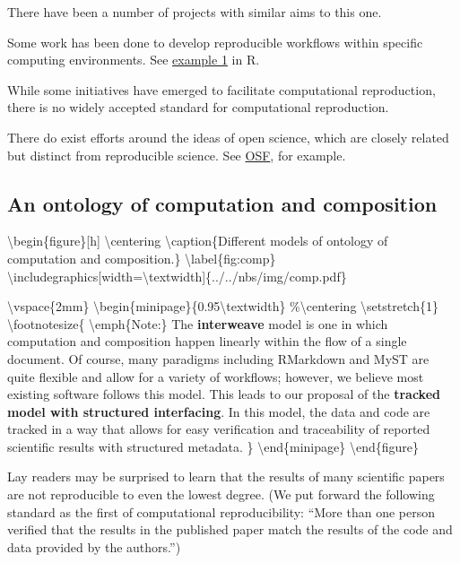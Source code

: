 There have been a number of projects with similar aims to this one.

Some work has been done to develop reproducible workflows within specific computing environments. See \href{https://mine-cetinkaya-rundel.github.io/improve-repro-workflow-reproducibilitea-2020/}{example 1} in R.

While some initiatives have emerged to facilitate computational reproduction, there is no widely accepted standard for computational reproduction. 

There do exist efforts around the ideas of open science, which are closely related but distinct from reproducible science. See \href{https://osf.io/tvyxz/}{OSF}, for example.

\hypertarget{an-ontology-of-computation-and-composition}{%
\subsection{An ontology of computation and composition}\label{an-ontology-of-computation-and-composition}}

\textbackslash{}begin\{figure\}[h]
\textbackslash{}centering
\textbackslash{}caption\{Different models of ontology of computation and composition.\}
\textbackslash{}label\{fig:comp\}
\textbackslash{}includegraphics[width=\textbackslash{}textwidth]\{../../nbs/img/comp.pdf\}

\textbackslash{}vspace\{2mm\}
\textbackslash{}begin\{minipage\}\{0.95\textbackslash{}textwidth\}
\%\textbackslash{}centering
\textbackslash{}setstretch\{1\}
\textbackslash{}footnotesize\{
\textbackslash{}emph\{Note:\} The \textbf{interweave} model is one in which computation and composition happen linearly within the flow of a single document. Of course, many paradigms including RMarkdown and MyST are quite flexible and allow for a variety of workflows; however, we believe most existing software follows this model. This leads to our proposal of the \textbf{tracked model with structured interfacing}. In this model, the data and code are tracked in a way that allows for easy verification and traceability of reported scientific results with structured metadata.
\}
\textbackslash{}end\{minipage\}
\textbackslash{}end\{figure\}

Lay readers may be surprised to learn that the results of many scientific papers are not reproducible to even the lowest degree. (We put forward the following standard as the first of computational reproducibility: ``More than one person verified that the results in the published paper match the results of the code and data provided by the authors.'') 

